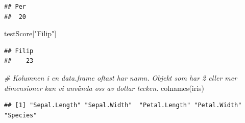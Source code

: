 \documentclass[
]{book}
\newenvironment{Shaded}{\begin{snugshade}}{\end{snugshade}}
\newcommand{\CommentTok}[1]{\textcolor[rgb]{0.56,0.35,0.01}{\textit{#1}}}
\newcommand{\FunctionTok}[1]{\textcolor[rgb]{0.00,0.00,0.00}{#1}}
\newcommand{\NormalTok}[1]{#1}
\newcommand{\StringTok}[1]{\textcolor[rgb]{0.31,0.60,0.02}{#1}}
\begin{document}
\begin{verbatim}
## Per 
##  20
\end{verbatim}

\begin{Shaded}
\begin{Highlighting}[]
\NormalTok{testScore[}\StringTok{"Filip"}\NormalTok{]}
\end{Highlighting}
\end{Shaded}

\begin{verbatim}
## Filip 
##    23
\end{verbatim}

\begin{Shaded}
\begin{Highlighting}[]
\CommentTok{\# Kolumnen i en data.frame oftast har namn. Objekt som har 2 eller mer dimensioner kan vi använda oss av dollar tecken.   }
\FunctionTok{colnames}\NormalTok{(iris)}
\end{Highlighting}
\end{Shaded}

\begin{verbatim}
## [1] "Sepal.Length" "Sepal.Width"  "Petal.Length" "Petal.Width"  "Species"
\end{verbatim}
\end{document}
